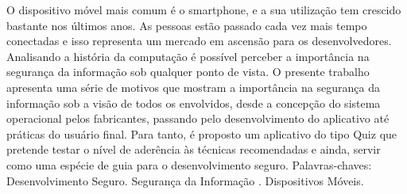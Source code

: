 \begin{resumo} 
  O dispositivo móvel mais comum é o smartphone, e a sua utilização tem crescido bastante nos últimos anos. As pessoas estão passado cada vez mais tempo conectadas e isso
representa um mercado em ascensão para os desenvolvedores. Analisando a história da
computação é possível perceber a importância na segurança da informação sob qualquer
ponto de vista. O presente trabalho apresenta uma série de motivos que mostram a importância na segurança da informação sob a visão de todos os envolvidos, desde a concepção
do sistema operacional pelos fabricantes, passando pelo desenvolvimento do aplicativo até
práticas do usuário final. Para tanto, é proposto um aplicativo do tipo Quiz que pretende
testar o nível de aderência às técnicas recomendadas e ainda, servir como uma espécie de
guia para o desenvolvimento seguro.
Palavras-chaves: Desenvolvimento Seguro. Segurança da Informação . Dispositivos Móveis.
\end{resumo}